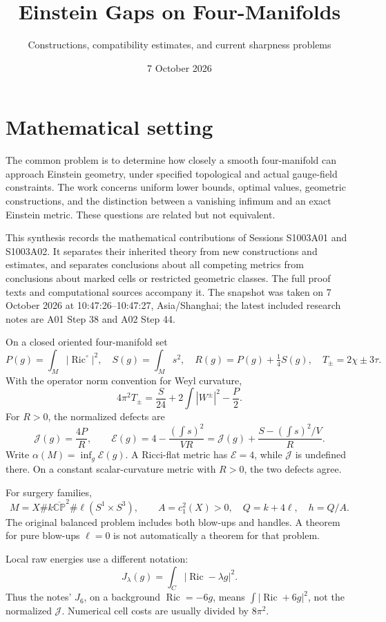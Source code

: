 \documentclass[
]{article}
\title{Einstein Gaps on Four-Manifolds}
\subtitle{Constructions, compatibility estimates, and current sharpness
problems}
\author{}
\date{7 October 2026}
\begin{document}
\maketitle

{
\hypersetup{linkcolor=}
\setcounter{tocdepth}{3}
\tableofcontents
}
\hypertarget{mathematical-setting}{%
\section{Mathematical setting}\label{mathematical-setting}}

The common problem is to determine how closely a smooth four-manifold
can approach Einstein geometry, under specified topological and actual
gauge-field constraints. The work concerns uniform lower bounds, optimal
values, geometric constructions, and the distinction between a vanishing
infimum and an exact Einstein metric. These questions are related but
not equivalent.

This synthesis records the mathematical contributions of Sessions
S1003A01 and S1003A02. It separates their inherited theory from new
constructions and estimates, and separates conclusions about all
competing metrics from conclusions about marked cells or restricted
geometric classes. The full proof texts and computational sources
accompany it. The snapshot was taken on 7 October 2026 at
10:47:26--10:47:27, Asia/Shanghai; the latest included research notes
are A01 Step 38 and A02 Step 44.

On a closed oriented four-manifold set \[
 P(g)=\int_M|\operatorname{Ric}^{\circ}|^2,\quad
 S(g)=\int_Ms^2,\quad R(g)=P(g)+\tfrac14S(g),\quad
 T_\pm=2\chi\pm3\tau.
\] With the operator norm convention for Weyl curvature, \[
 4\pi^2T_\pm=\frac{S}{24}+2\int|W^\pm|^2-\frac P2.
\] For \(R>0\), the normalized defects are \[
 \mathcal J(g)=\frac{4P}{R},\qquad
 \mathcal E(g)=4-\frac{(\int s)^2}{VR}
 =\mathcal J(g)+\frac{S-(\int s)^2/V}{R}.
\] Write \(\alpha(M)=\inf_g\mathcal E(g)\). A Ricci-flat metric has
\(\mathcal E=4\), while \(\mathcal J\) is undefined there. On a constant
scalar-curvature metric with \(R>0\), the two defects agree.

For surgery families, \[
 M=X\#k\overline{\mathbb{CP}}^{2}\#\ell(S^1\times S^3),\qquad
 A=c_1^2(X)>0,\quad Q=k+4\ell,\quad h=Q/A.
\] The original balanced problem includes both blow-ups and handles. A
theorem for pure blow-ups \(\ell=0\) is not automatically a theorem for
that problem.

Local raw energies use a different notation: \[
 J_\lambda(g)=\int_C|\operatorname{Ric}-\lambda g|^2.
\] Thus the notes' \(J_6\), on a background \(\operatorname{Ric}=-6g\),
means \(\int|\operatorname{Ric}+6g|^2\), not the normalized
\(\mathcal J\). Numerical cell costs are usually divided by \(8\pi^2\).
\end{document}
